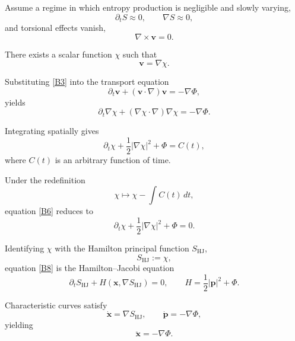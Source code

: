 \documentclass[11pt]{article}
\begin{document}
Assume a regime in which entropy production is negligible and slowly varying,
\begin{equation}
\partial_t S \approx 0,
\qquad
\nabla S \approx 0,
\label{B1}
\end{equation}
and torsional effects vanish,
\begin{equation}
\nabla \times \mathbf{v} = 0.
\label{B2}
\end{equation}

There exists a scalar function $\chi$ such that
\begin{equation}
\mathbf{v} = \nabla \chi.
\label{B3}
\end{equation}

Substituting \eqref{B3} into the transport equation
\begin{equation}
\partial_t \mathbf{v} + (\mathbf{v}\cdot\nabla)\mathbf{v} = -\nabla\Phi,
\label{B4}
\end{equation}
yields
\begin{equation}
\partial_t \nabla\chi + (\nabla\chi\cdot\nabla)\nabla\chi = -\nabla\Phi.
\label{B5}
\end{equation}

Integrating spatially gives
\begin{equation}
\partial_t \chi + \frac{1}{2}|\nabla\chi|^2 + \Phi = C(t),
\label{B6}
\end{equation}
where $C(t)$ is an arbitrary function of time.

Under the redefinition
\begin{equation}
\chi \mapsto \chi - \int C(t)\,dt,
\label{B7}
\end{equation}
equation \eqref{B6} reduces to
\begin{equation}
\partial_t \chi + \frac{1}{2}|\nabla\chi|^2 + \Phi = 0.
\label{B8}
\end{equation}

Identifying $\chi$ with the Hamilton principal function $S_{\mathrm{HJ}}$,
\begin{equation}
S_{\mathrm{HJ}} := \chi,
\label{B9}
\end{equation}
equation \eqref{B8} is the Hamilton--Jacobi equation
\begin{equation}
\partial_t S_{\mathrm{HJ}} + H(\mathbf{x},\nabla S_{\mathrm{HJ}}) = 0,
\qquad
H = \frac{1}{2}|\mathbf{p}|^2 + \Phi.
\label{B10}
\end{equation}

Characteristic curves satisfy
\begin{equation}
\dot{\mathbf{x}} = \nabla S_{\mathrm{HJ}},
\qquad
\dot{\mathbf{p}} = -\nabla\Phi,
\label{B11}
\end{equation}
yielding
\begin{equation}
\ddot{\mathbf{x}} = -\nabla\Phi.
\label{B12}
\end{equation}
\end{document}
